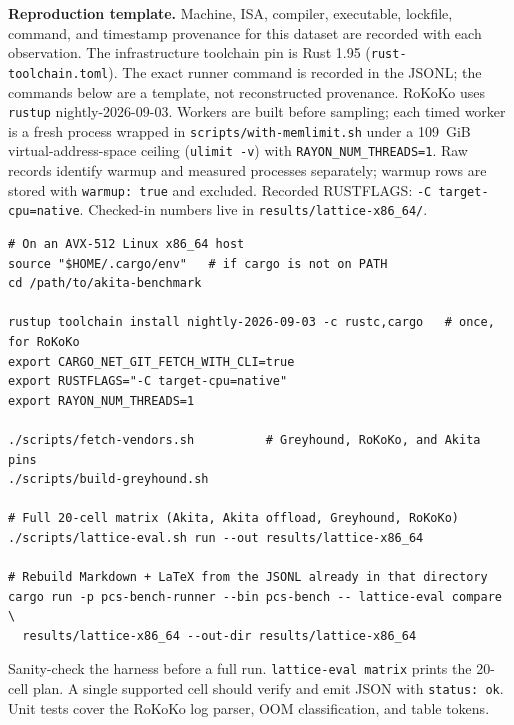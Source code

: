 \medskip
\noindent\textbf{Reproduction template.}
Machine, ISA, compiler, executable, lockfile, command, and timestamp provenance
for this dataset are recorded with each observation. The infrastructure
toolchain pin is Rust 1.95 (\texttt{rust-toolchain.toml}).
The exact runner command is recorded in the JSONL; the commands below are a
template, not reconstructed provenance.
RoKoKo uses \texttt{rustup} nightly-2026-09-03. Workers are built before
sampling; each timed worker is a fresh process wrapped in
\texttt{scripts/with-memlimit.sh} under a 109~GiB
virtual-address-space ceiling (\texttt{ulimit -v}) with
\texttt{RAYON\_NUM\_THREADS=1}. Raw records identify warmup and measured
processes separately; warmup rows are stored with \texttt{warmup: true} and excluded.
Recorded RUSTFLAGS: \texttt{{-C target-cpu=native}}.
Checked-in numbers live in \texttt{results/lattice-x86\_64/}.
\begin{verbatim}
# On an AVX-512 Linux x86_64 host
source "$HOME/.cargo/env"   # if cargo is not on PATH
cd /path/to/akita-benchmark

rustup toolchain install nightly-2026-09-03 -c rustc,cargo   # once, for RoKoKo
export CARGO_NET_GIT_FETCH_WITH_CLI=true
export RUSTFLAGS="-C target-cpu=native"
export RAYON_NUM_THREADS=1

./scripts/fetch-vendors.sh          # Greyhound, RoKoKo, and Akita pins
./scripts/build-greyhound.sh

# Full 20-cell matrix (Akita, Akita offload, Greyhound, RoKoKo)
./scripts/lattice-eval.sh run --out results/lattice-x86_64

# Rebuild Markdown + LaTeX from the JSONL already in that directory
cargo run -p pcs-bench-runner --bin pcs-bench -- lattice-eval compare \
  results/lattice-x86_64 --out-dir results/lattice-x86_64
\end{verbatim}
\noindent Sanity-check the harness before a full run.
\texttt{lattice-eval matrix} prints the 20-cell plan.
A single supported cell should verify and emit JSON with \texttt{status: ok}.
Unit tests cover the RoKoKo log parser, OOM classification, and table tokens.
